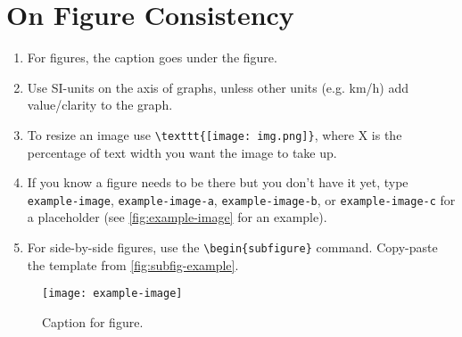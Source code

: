 \section*{On Figure Consistency}
\label{sec:figure-consistency}
\begin{enumerate}[label=F.\arabic*]
    \item For figures, the caption goes under the figure.
    \item Use SI-units on the axis of graphs, unless other units (e.g. km/h) add value/clarity to the graph.
    \item To resize an image use \verb|\texttt{[image: img.png]}|, where X is the percentage of text width you want the image to take up.
    \item If you know a figure needs to be there but you don't have it yet, type \verb|example-image|, \verb|example-image-a|, \verb|example-image-b|, or \verb|example-image-c| for a placeholder (see \autoref{fig:example-image} for an example).
    \item For side-by-side figures, use the \verb|\begin{subfigure}| command. Copy-paste the template from \autoref{fig:subfig-example}.
\end{enumerate}

\begin{figure}[tph]
    \centering
    \texttt{[image: example-image]} %
    \caption{Caption for figure.}
    \label{fig:example-image}
\end{figure}

